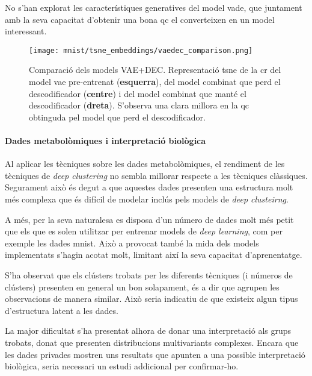 \documentclass[CAT,BIB]{TFUOC}%
\begin{document}
        No s'han explorat les característiques generatives
        del model \gls{vade},
        que juntament amb la seva capacitat d'obtenir una bona \gls{qc}
        el converteixen en un model interessant.

        \begin{figure}
            \centering
            \texttt{[image: mnist/tsne\_embeddings/vaedec\_comparison.png]}
            \caption[Comparació dels models VAE+DEC]{
                Comparació dels models VAE+DEC.
                Representació \gls{tsne} de la \gls{cr} del model \gls{vae} pre-entrenat (\textbf{esquerra}),
                del model combinat que perd el descodificador (\textbf{centre})
                i del model combinat que manté el descodificador (\textbf{dreta}).
                S'observa una clara millora en la \gls{qc} obtinguda pel model que perd el descodificador.
            }
            \label{f:vaedec_comp}
        \end{figure}


    \paragraph{Dades metabolòmiques i interpretació biològica}
        Al aplicar les tècniques sobre les dades metabolòmiques,
        el rendiment de les tècniques de \textit{deep clustering}
        no sembla millorar respecte a les tècniques clàssiques.
        Segurament això és degut a que aquestes dades presenten
        una estructura molt més complexa
        que és difícil de modelar inclús pels models de \textit{deep clusteirng}.

        A més, per la seva naturalesa es disposa d'un número de dades molt més petit
        que els que es solen utilitzar per entrenar models de \textit{deep learning},
        com per exemple les dades \gls{mnist}.
        Això a provocat també la mida dels models implementats
        s'hagin acotat molt,
        limitant així la seva capacitat d'aprenentatge.

        S'ha observat que els clústers trobats per les diferents tècniques
        (i números de clústers)
        presenten en general un bon solapament,
        és a dir que agrupen les observacions de manera similar.
        Això seria indicatiu de que existeix algun tipus d'estructura latent a les dades.

        La major dificultat s'ha presentat
        alhora de donar una interpretació als grups trobats,
        donat que presenten distribucions multivariants complexes.
        Encara que les dades \gls{privades} mostren
        uns resultats que apunten a una possible interpretació biològica,
        seria necessari un estudi addicional per confirmar-ho.
\end{document}
